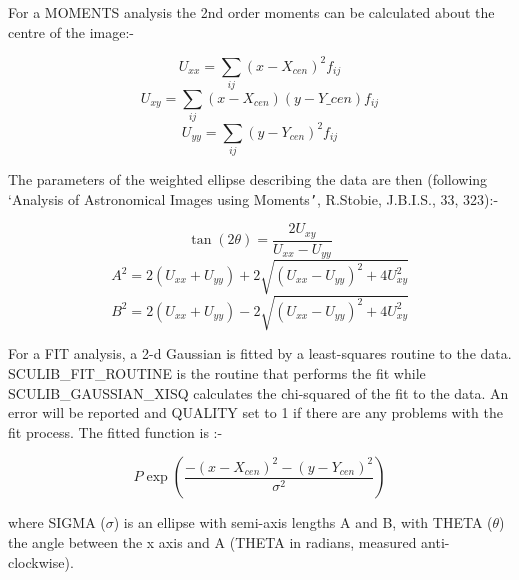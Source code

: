 {{      For a MOMENTS analysis the 2nd order moments can be calculated about the
      centre of the image:-

\begin{equation}
          U_{xx} = \sum_{ij} (x - X_{cen})^2 f_{ij}
\end{equation}
\begin{equation}
          U_{xy} = \sum_{ij} (x - X_{cen})(y - Y\_{cen}) f_{ij}
\end{equation}
\begin{equation}
          U_{yy} = \sum_{ij} (y - Y_{cen})^2  f_{ij}
\end{equation}

      The parameters of the weighted ellipse describing the data are then
      (following `Analysis of Astronomical Images using Moments{\tt '}, R.Stobie,
      J.B.I.S., 33, 323):-

\begin{equation}
\tan(2\theta) = \frac{2 U_{xy}}{U_{xx} - U_{yy}}
\end{equation}
\begin{equation}
A^2 = 2 ( U_{xx} + U_{yy} ) + 2 \sqrt{(U_{xx} - U_{yy})^2 + 4U_{xy}^2}
\end{equation}
\begin{equation}
B^2 = 2 ( U_{xx} + U_{yy} ) - 2 \sqrt{(U_{xx} - U_{yy})^2 + 4U_{xy}^2}
\end{equation}

      For a FIT analysis, a 2-d Gaussian is fitted by a least-squares
      routine to the data. SCULIB\_FIT\_ROUTINE is the routine that performs
      the fit while SCULIB\_GAUSSIAN\_XISQ calculates the chi-squared of the
      fit to the data. An error will be reported and QUALITY set to 1
      if there are any problems with the fit process. The fitted function
      is :-

\begin{equation}
  P \exp( \frac{-(x-X_{cen})^2 - (y-Y_{cen})^2}{\sigma^2})
\end{equation}

      where SIGMA ($\sigma$) is an ellipse with semi-axis lengths A and B, with
THETA ($\theta$)
      the angle between the x axis and A (THETA in radians, measured
      anti-clockwise).

}}
